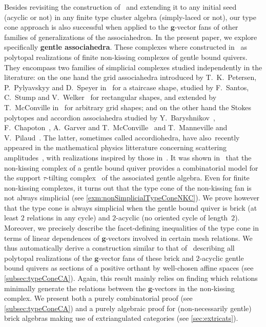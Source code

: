 \documentclass{amsart}
\theoremstyle{definition}
\renewcommand{\b}[1]{{\boldsymbol{#1}}} %
\begin{document}
\medskip
\enlargethispage{.4cm}
Besides revisiting the construction of~\cite{ArkaniHamedBaiHeYan, BazierMatteChapelierLaguetDouvilleMousavandThomasYildirim} and extending it to any initial seed (acyclic or not) in any finite type cluster algebra (simply-laced or not), our type cone approach is also successful when applied to the $\b{g}$-vector fans of other families of generalizations of the associahedron.
In the present paper, we explore specifically \textbf{gentle associahedra}. These complexes where constructed in~\cite{PaluPilaudPlamondon-nonkissing} as polytopal realizations of finite non-kissing complexes of gentle bound quivers. They encompass two families of simplicial complexes studied independently in the literature: on the one hand the grid associahedra introduced by T.~K.~Petersen, P.~Pylyavskyy and D.~Speyer in~\cite{PetersenPylyavskyySpeyer} for a staircase shape, studied by F.~Santos, C.~Stump and V.~Welker~\cite{SantosStumpWelker} for rectangular shapes, and extended by T.~McConville in~\cite{McConville} for arbitrary grid shapes; and on the other hand the Stokes polytopes and accordion associahedra studied by Y.~Baryshnikov~\cite{Baryshnikov}, F.~Chapoton~\cite{Chapoton-quadrangulations}, A.~Garver and T.~McConville~\cite{GarverMcConville} and T.~Manneville and V.~Pilaud~\cite{MannevillePilaud-accordion}. The latter, sometimes called accordiohedra, have also~recently appeared in the mathematical physics litterature concerning scattering amplitudes~\cite{BanerjeeLaddhaRaman, Raman}, with realizations inspired by those in~\cite{ArkaniHamedBaiHeYan}. It was shown in~\cite{PaluPilaudPlamondon-nonkissing, BrustleDouvilleMousavandThomasYildirim} that the non-kissing complex of a gentle bound quiver provides a combinatorial model for the support $\tau$-tilting complex~\cite{AdachiIyamaReiten} of the associated gentle algebra. Even for finite non-kissing complexes, it turns out that the type cone of the non-kissing fan is not always simplicial (see \cref{exm:nonSimplicialTypeConeNKC}). We prove however that the type cone is always simplicial when the gentle bound quiver is brick (at least $2$ relations in any cycle) and $2$-acyclic (no oriented cycle of length~$2$). Moreover, we precisely describe the facet-defining inequalities of the type cone in terms of linear dependences of $\b{g}$-vectors involved in certain mesh relations. We thus automatically derive a construction similar to that of~\cite{ArkaniHamedBaiHeYan, BazierMatteChapelierLaguetDouvilleMousavandThomasYildirim} describing all polytopal realizations of the $\b{g}$-vector fans of these brick and $2$-acyclic gentle bound quivers as sections of a positive orthant by well-chosen affine spaces (see \cref{subsec:typeConeCA}). Again, this result mainly relies on finding which relations minimally generate the relations between the $\b{g}$-vectors in the non-kissing complex. We present both a purely combinatorial proof (see \cref{subsec:typeConeCA}) and a purely algebraic proof for (non-necessarily gentle) brick algebras making use of extriangulated categories (see \cref{sec:extricats}).
\end{document}
